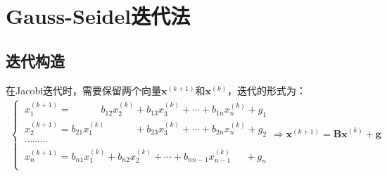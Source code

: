 \section{Gauss-Seidel迭代法}
\subsection{迭代构造}
在Jacobi迭代时，需要保留两个向量$\boldsymbol{x}^{(k+1)}$和$\boldsymbol{x}^{(k)}$，迭代的形式为：
\begin{align}
    \begin{cases}
        \ x_1^{(k+1)} = \qquad \quad b_{12}x_2^{(k)} + b_{13}x_3^{(k)} + \cdots + b_{1n}x_n^{(k)} + g_1 \\
        \ x_2^{(k+1)} = b_{21}x_1^{(k)} \qquad \quad + b_{23}x_3^{(k)} + \cdots + b_{2n}x_n^{(k)} + g_2 \\
        \ \cdots \cdots \cdots \\
        \ x_n^{(k+1)} = b_{n1}x_1^{(k)}  + b_{n2}x_2^{(k)} + \cdots + b_{nn-1}x_{n-1}^{(k)} \quad \ \  + g_n \\
    \end{cases} \Rightarrow \boldsymbol{x}^{(k+1)} = \boldsymbol{Bx}^{(k)} + \boldsymbol{g}
\end{align}

